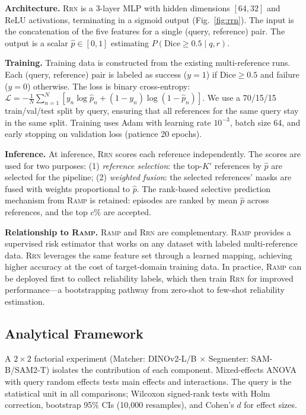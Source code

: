\documentclass[10pt,twocolumn,letterpaper]{article}
\newcommand{\RAMP}{\textsc{Ramp}}
\newcommand{\RRN}{\textsc{Rrn}}
\begin{document}
\textbf{Architecture.} \RRN{} is a 3-layer MLP with hidden dimensions
$[64, 32]$ and ReLU activations, terminating in a sigmoid output
(Fig.~\ref{fig:rrn}). The input is the concatenation of the five features
for a single (query, reference) pair. The output is a scalar
$\hat{p} \in [0,1]$ estimating $P(\text{Dice} \geq 0.5 \mid q, r)$.

\textbf{Training.} Training data is constructed from the existing
multi-reference runs. Each (query, reference) pair is labeled as success
($y=1$) if $\text{Dice} \geq 0.5$ and failure ($y=0$) otherwise. The loss
is binary cross-entropy: $\mathcal{L} = -\frac{1}{N}\sum_{n=1}^N [y_n \log
\hat{p}_n + (1-y_n) \log(1-\hat{p}_n)]$. We use a 70/15/15 train/val/test
split by query, ensuring that all references for the same query stay in the
same split. Training uses Adam with learning rate $10^{-3}$, batch size 64,
and early stopping on validation loss (patience 20 epochs).

\textbf{Inference.} At inference, \RRN{} scores each reference independently.
The scores are used for two purposes: (1) \emph{reference selection}: the
top-$K'$ references by $\hat{p}$ are selected for the pipeline; (2)
\emph{weighted fusion}: the selected references' masks are fused with
weights proportional to $\hat{p}$. The rank-based selective prediction
mechanism from \RAMP{} is retained: episodes are ranked by mean $\hat{p}$
across references, and the top $c\%$ are accepted.

\textbf{Relationship to \RAMP.} \RAMP{} and \RRN{} are complementary.
\RAMP{} provides a supervised risk estimator that works on any
dataset with labeled multi-reference data. \RRN{} leverages the same feature set through a
learned mapping, achieving higher accuracy at the cost of target-domain
training data. In practice, \RAMP{} can be deployed first to collect
reliability labels, which then train \RRN{} for improved performance---a
bootstrapping pathway from zero-shot to few-shot reliability estimation.

\subsection{Analytical Framework}

A $2\times 2$ factorial experiment (Matcher: DINOv2-L/B $\times$ Segmenter:
SAM-B/SAM2-T) isolates the contribution of each component. Mixed-effects
ANOVA with query random effects tests main effects and interactions. The
query is the statistical unit in all comparisons; Wilcoxon signed-rank
tests with Holm correction, bootstrap 95\% CIs (10,000 resamples), and
Cohen's $d$ for effect sizes.
\end{document}
